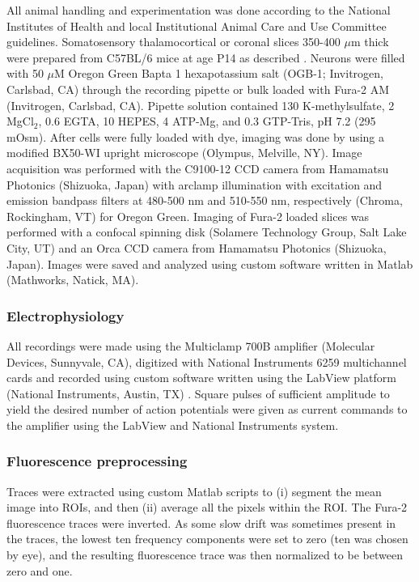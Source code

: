 All animal handling and experimentation was done according to the National Institutes of Health and local Institutional Animal Care and Use Committee guidelines. Somatosensory thalamocortical or coronal slices 350-400 $\mu$m thick were prepared from C57BL/6 mice at age P14 as described \cite{MacLeanYuste05}. Neurons were filled with 50 $\mu$M Oregon Green Bapta 1 hexapotassium salt (OGB-1; Invitrogen, Carlsbad, CA) through the recording pipette or bulk loaded with Fura-2 AM (Invitrogen, Carlsbad, CA). Pipette solution contained 130 K-methylsulfate, 2 MgCl$_2$, $0.6$ EGTA, 10 HEPES, 4 ATP-Mg, and $0.3$ GTP-Tris, pH 7.2 (295 mOsm).  After cells were fully loaded with dye, imaging was done by using a modified BX50-WI upright microscope (Olympus, Melville, NY).  Image acquisition was performed with the C9100-12 CCD camera from Hamamatsu Photonics (Shizuoka, Japan) with arclamp illumination with excitation and emission bandpass filters at 480-500 nm and 510-550 nm, respectively  (Chroma, Rockingham, VT) for Oregon Green. Imaging of Fura-2 loaded slices was performed with a confocal spinning disk (Solamere Technology Group, Salt Lake City, UT) and an Orca CCD camera from Hamamatsu Photonics (Shizuoka, Japan). Images were saved and analyzed using custom software written in Matlab (Mathworks, Natick, MA).

\subsubsection{Electrophysiology}

All recordings were made using the Multiclamp 700B amplifier (Molecular Devices, Sunnyvale, CA), digitized with National Instruments 6259 multichannel cards and recorded using custom software written using the LabView platform (National Instruments, Austin, TX) .  Square pulses of sufficient amplitude to yield the desired number of action potentials were given as current commands to the amplifier using the LabView and National Instruments system.

\subsubsection{Fluorescence preprocessing}

Traces were extracted using custom Matlab scripts to (i) segment the mean image into ROIs, and then (ii) average all the pixels within the ROI.  The Fura-2 fluorescence traces were inverted.  As some slow drift was sometimes present in the traces, the lowest ten frequency components were set to zero (ten was chosen by eye), and the resulting fluorescence trace was then normalized to be between zero and one.









